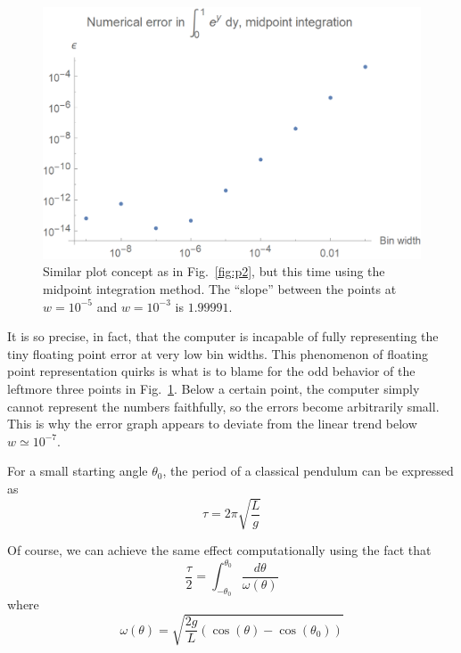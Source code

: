 \documentclass{article}
\begin{document}
\begin{figure}[!h]
    \centering
    \includegraphics[width=4.75in]{homework2/P3.png}
    \caption{Similar plot concept as in Fig.~\ref{fig:p2}, but this time using the midpoint integration method. The ``slope'' between the points at $w=10^{-5}$ and $w=10^{-3}$ is $1.99991$.}
    \label{fig:p3}
\end{figure}

It is so precise, in fact, that the computer is incapable of fully representing the tiny floating point error at very low bin widths. This phenomenon of floating point representation quirks is what is to blame for the odd behavior of the leftmore three points in Fig.~\ref{fig:p3}. Below a certain point, the computer simply cannot represent the numbers faithfully, so the errors become arbitrarily small. This is why the error graph appears to deviate from the linear trend below $w\simeq10^{-7}$.

\bigskip
{}
\medskip

For a small starting angle $\theta_0$, the period of a classical pendulum can be expressed as
\begin{equation} \label{eq:smallangle}
    \tau = 2\pi\sqrt{\frac{L}{g}}
\end{equation}

Of course, we can achieve the same effect computationally using the fact that
\begin{equation}
    \frac{\tau}{2} = \int_{-\theta_0}^{\theta_0}\frac{d\theta}{\omega(\theta)}
\end{equation}
where
\begin{equation}
    \omega(\theta) = \sqrt{\frac{2g}{L}(\cos(\theta)-\cos(\theta_0))}
\end{equation}
\end{document}
